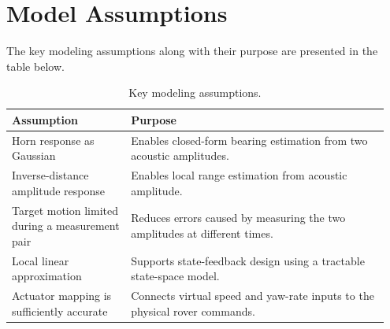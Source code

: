 \documentclass[journal,a4paper]{IEEEtran}
\begin{document}
\section{Model Assumptions}
The key modeling assumptions along with their purpose are presented in the table below.
\begin{table}[H]
\centering
\caption{Key modeling assumptions.}
\label{tab:model_assumptions}
\small
\renewcommand{\arraystretch}{1.2}
\begin{tabular}{p{0.3\linewidth} p{0.65\linewidth}}
\hline
\textbf{Assumption} & \textbf{Purpose} \\
\hline
Horn response as Gaussian
& Enables closed-form bearing estimation from two acoustic amplitudes. \\

Inverse-distance amplitude response
& Enables local range estimation from acoustic amplitude. \\

Target motion limited during a measurement pair
& Reduces errors caused by measuring the two amplitudes at different times. \\

Local linear approximation
& Supports state-feedback design using a tractable state-space model. \\

Actuator mapping is sufficiently accurate
& Connects virtual speed and yaw-rate inputs to the physical rover commands. \\
\hline
\end{tabular}
\end{table}
\end{document}
